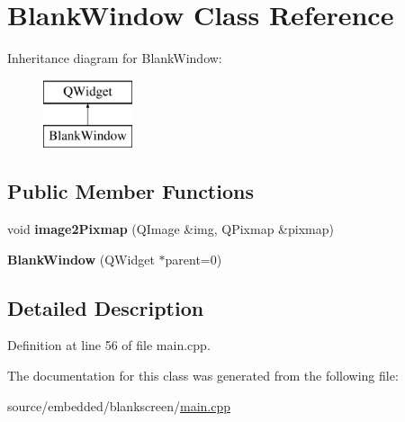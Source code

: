 \hypertarget{class_blank_window}{\section{Blank\-Window Class Reference}
\label{class_blank_window}
}
Inheritance diagram for Blank\-Window\-:\begin{figure}[H]
\begin{center}
\leavevmode
\includegraphics[height=2.000000cm]{class_blank_window}
\end{center}
\end{figure}
\subsection*{Public Member Functions}
\begin{DoxyCompactItemize}
\item 
\hypertarget{class_blank_window_ad41e543f33d9843b4e0587300233c229}{void {\bfseries image2\-Pixmap} (Q\-Image \&img, Q\-Pixmap \&pixmap)}\label{class_blank_window_ad41e543f33d9843b4e0587300233c229}

\item 
\hypertarget{class_blank_window_a0609c4bee1ef04c678936ce534c6c2d3}{{\bfseries Blank\-Window} (Q\-Widget $\ast$parent=0)}\label{class_blank_window_a0609c4bee1ef04c678936ce534c6c2d3}

\end{DoxyCompactItemize}


\subsection{Detailed Description}


Definition at line 56 of file main.\-cpp.



The documentation for this class was generated from the following file\-:\begin{DoxyCompactItemize}
\item 
source/embedded/blankscreen/\hyperlink{embedded_2blankscreen_2main_8cpp}{main.\-cpp}\end{DoxyCompactItemize}
